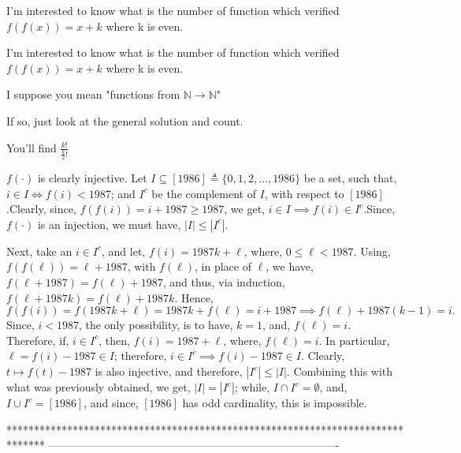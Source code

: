 \begin{solution}
	I'm interested to know what is the number of function which verified $f(f(x))=x+k$ where k is even.
\end{solution}



\begin{solution}
	\begin{tcolorbox}I'm interested to know what is the number of function which verified $f(f(x))=x+k$ where k is even.\end{tcolorbox}
I suppose you mean "functions from $\mathbb N\to\mathbb N$"

If so, just look at the general solution and count.

You'll find $\frac{k!}{\frac k2!}$



\end{solution}



\begin{solution}
	$f(\cdot)$ is clearly injective. Let $I\subseteq [1986]\triangleq \{0,1,2,\dots,1986\}$ be a set, such that, $i\in I\iff f(i)<1987$; and $I^c$ be the complement of $I$, with respect to $[1986]$.Clearly, since, $f(f(i))=i+1987 \geq 1987$, we get, $i\in I \implies f(i)\in I^c$.Since, $f(\cdot)$ is an injection, we must have, $|I|\leq |I^c|$.

Next, take an $i\in I^c$, and let, $f(i)=1987k+\ell$, where, $0\leq \ell <1987$. Using, $f(f(\ell))=\ell+1987$, with $f(\ell)$, in place of $\ell$, we have, $f(\ell+1987)=f(\ell)+1987$, and thus, via induction, $f(\ell+1987k)=f(\ell)+1987k$. Hence,
$$
f(f(i))=f(1987k+\ell)=1987k+f(\ell)=i+1987 \implies f(\ell)+1987(k-1)=i.
$$
Since, $i<1987$, the only possibility,  is to have, $k=1$, and, $f(\ell)=i$. Therefore, if, $i\in I^c$, then, $f(i)=1987+\ell$, where, $f(\ell)=i$. In particular, $\ell = f(i)-1987 \in I$; therefore, $i\in I^c \implies f(i)-1987 \in I$. Clearly, $t\mapsto f(t)-1987$ is also injective, and therefore, $|I^c|\leq |I|$. Combining this with what was previously obtained, we get, $|I|=|I^c|$; while, $I\cap I^c=\emptyset$, and, $I\cup I^c=[1986]$, and since, $[1986]$ has odd cardinality, this is impossible.
\end{solution}
*******************************************************************************
-------------------------------------------------------------------------------

